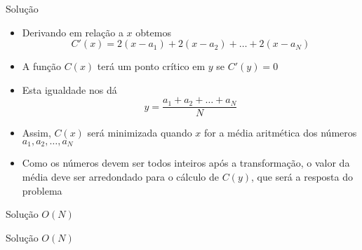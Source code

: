 \begin{frame}[fragile]{Solução}

    \begin{itemize}
        \item Derivando em relação a $x$ obtemos
        \[
            C'(x) = 2(x - a_1) + 2(x - a_2) + \ldots + 2(x - a_N)
        \]

        \item A função $C(x)$ terá um ponto crítico em $y$ se $C'(y) = 0$

        \item Esta igualdade nos dá
        \[
            y = \frac{a_1 + a_2 + \ldots + a_N}{N}
        \]

        \item Assim, $C(x)$ será minimizada quando $x$ for a média aritmética dos números
            $a_1, a_2, \ldots, a_N$

        \item Como os números devem ser todos inteiros após a transformação, o valor da média
            deve ser arredondado para o cálculo de $C(y)$, que será a resposta do problema
    \end{itemize}

\end{frame}
\begin{frame}[fragile]{Solução $O(N)$}
\end{frame}

\begin{frame}[fragile]{Solução $O(N)$}
\end{frame}
